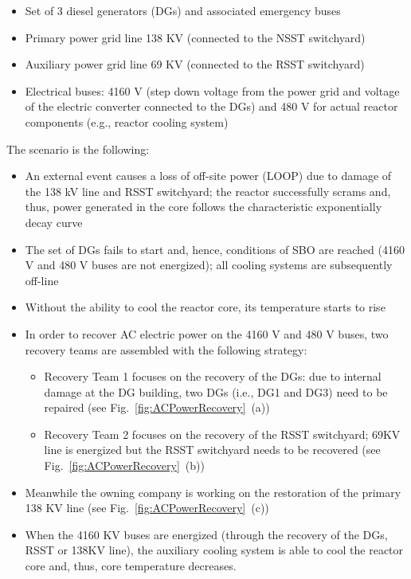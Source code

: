 \begin{itemize}
\item Set of 3 diesel generators (DGs) and associated emergency buses
\item Primary power grid line 138 KV (connected to the NSST switchyard)
\item Auxiliary power grid line 69 KV (connected to the RSST switchyard)
\item Electrical buses: 4160 V (step down voltage from the power grid and voltage of the electric converter connected to the DGs) and 480 V for actual reactor components (e.g., reactor cooling system)
\end{itemize}
The scenario is the following:
\begin{itemize}
\item An external event causes a loss of off-site power (LOOP) due to damage of the 138 kV line and RSST switchyard; the reactor successfully scrams and, thus, power generated in the core follows the characteristic exponentially decay curve
\item The set of DGs fails to start and, hence, conditions of SBO are reached (4160 V and 480 V buses are not energized); all cooling systems are subsequently off-line
\item Without the ability to cool the reactor core, its temperature starts to rise
\item In order to recover AC electric power on the 4160 V and 480 V buses, two recovery teams are assembled with the following strategy:
\begin{itemize}
\item Recovery Team 1 focuses on the recovery of the DGs: due to internal damage at the DG building, two DGs (i.e., DG1 and DG3) need to be repaired (see Fig.~\ref{fig:ACPowerRecovery}~(a))
\item Recovery Team 2 focuses on the recovery of the RSST switchyard; 69KV line is energized but the RSST switchyard needs to be recovered (see Fig.~\ref{fig:ACPowerRecovery}~(b))
\end{itemize}
\item Meanwhile the owning company is working on the restoration of the primary 138 KV line (see Fig.~\ref{fig:ACPowerRecovery}~(c))
\item When the 4160 KV buses are energized (through the recovery of the DGs, RSST or 138KV line), the auxiliary cooling system is able to cool the reactor core and, thus, core temperature decreases.
\end{itemize}

